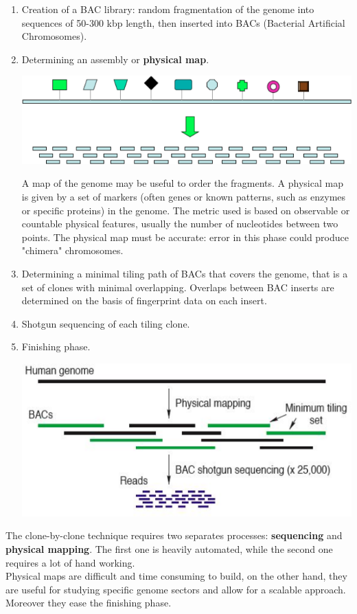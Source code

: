 \begin{enumerate}
	\item Creation of a BAC library: random fragmentation of the genome into sequences of 50-300 kbp length, then inserted into BACs (Bacterial Artificial Chromosomes).
	\item Determining an assembly or \textbf{physical map}.
		\begin{center}
			\includegraphics[width=0.8\columnwidth]{img/hierarchical3}
		\end{center}
		A map of the genome may be useful to order the fragments. A physical map is given by a set of markers (often genes or known patterns, such as enzymes or specific proteins) in the genome. The metric used is based on observable or countable physical features, usually the number of nucleotides between two points. The physical map must be accurate: error in this phase could produce "chimera" chromosomes.
	\item Determining a minimal tiling path of BACs that covers the genome, that is a set of clones with minimal overlapping. Overlaps between BAC inserts are determined on the basis of fingerprint data on each insert.
	\item Shotgun sequencing of each tiling clone.
	\item Finishing phase.
		\begin{center}
			\includegraphics[width=0.8\columnwidth]{img/hierarchical2}
		\end{center}
\end{enumerate}
The clone-by-clone technique requires two separates processes: \textbf{sequencing} and \textbf{physical mapping}. The first one is heavily automated, while the second one requires a lot of hand working.\\
Physical maps are difficult and time consuming to build, on the other hand, they are useful for studying specific genome sectors and allow for a scalable approach. Moreover they ease the finishing phase.

